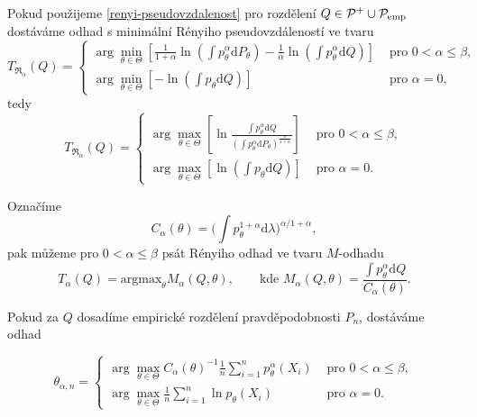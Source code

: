 \noindent Pokud použijeme \eqref{renyi-pseudovzdalenost} pro rozdělení $Q \in \mathcal{P}^+ \cup \mathcal{P}_\mathrm{emp}$ dostáváme odhad s minimální Rényiho pseudovzdáleností ve tvaru
\begin{equation}
	T_{\mathfrak{R}_\alpha}(Q) = 
	\begin{cases}
		 \displaystyle{ \arg \min_{\theta \in \Theta} \left[\frac{1}{1+\alpha} \ln(\int p_\theta^\alpha\mathrm{d}P_\theta) - \frac{1}{\alpha} \ln(\int p_\theta^\alpha\mathrm{d}Q) \right]} & \text{ pro } 0 < \alpha \leq \beta, \\[5mm]
		 \displaystyle{ \arg \min_{\theta \in \Theta} \left[- \ln(\int p_\theta\mathrm{d}Q) \right] }& \text{ pro } \alpha = 0,
	\end{cases}	
\end{equation}
tedy
\begin{equation}
	T_{\mathfrak{R}_\alpha}(Q) = 
	\begin{cases}
		 \displaystyle{ \arg \max_{\theta \in \Theta} \left[\ln\frac{\int p_\theta^\alpha\mathrm{d}Q}{(\int p_\theta^\alpha\mathrm{d}P_\theta)^{\frac{\alpha}{1+\alpha}}} \right] }& \text{ pro } 0 < \alpha \leq \beta, \\[5mm]
		 \displaystyle{ \arg \max_{\theta \in \Theta} \left[\ln(\int p_\theta\mathrm{d}Q) \right] }& \text{ pro } \alpha = 0.
	\end{cases}	
\end{equation}

\noindent Označíme
\begin{equation}
C_{\alpha}(\theta) = \biggl(\int p_{\theta}^{1+\alpha} \mathrm{d}\lambda\biggr)^{\alpha/{1+\alpha}},
\end{equation}
pak můžeme pro $0<\alpha \leq \beta$ psát Rényiho odhad ve tvaru $M$-odhadu
\begin{equation}
T_{\alpha}(Q) = \text{argmax}_{\theta} M_{\alpha}(Q,\theta), \qquad \text{kde } M_{\alpha}(Q,\theta) = \frac{\int p_{\theta}^{\alpha}\mathrm{d}Q}{C_{\alpha}(\theta)}.
\end{equation}

\noindent Pokud za $Q$ dosadíme empirické rozdělení pravděpodobnosti $P_n$, dostáváme odhad 

\begin{equation}
	\theta_{\alpha,n} = 
	\begin{cases}
		\displaystyle{ \arg \max_{\theta \in \Theta} C_\alpha\left( \theta \right)^{-1} \frac{1}{n} \sum_{i=1}^n p_{\theta}^{\alpha}\left( X_i \right) } & \text{ pro } 0 < \alpha \leq \beta, \\
		\displaystyle{ \arg \max_{\theta \in \Theta}  \frac{1}{n} \sum_{i=1}^n \ln p_{\theta}\left( X_i \right) } & \text{ pro } \alpha = 0.
	\end{cases}	
	\label{Renyi-estimator_formula}
\end{equation}

